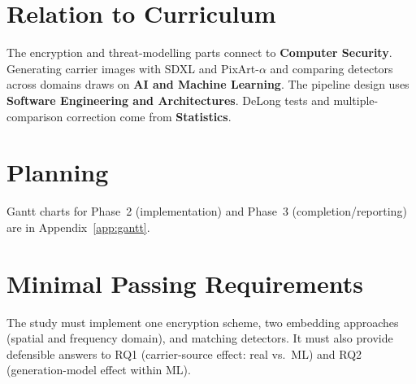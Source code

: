 \documentclass[10pt,twocolumn,a4paper]{article}
\begin{document}
\section{Relation to Curriculum}

The encryption and threat-modelling parts connect to \textbf{Computer Security}. Generating carrier images with SDXL and PixArt-$\alpha$ and comparing detectors across domains draws on \textbf{AI and Machine Learning}. The pipeline design uses \textbf{Software Engineering and Architectures}. DeLong tests and multiple-comparison correction come from \textbf{Statistics}.

\section{Planning}

Gantt charts for Phase~2 (implementation) and Phase~3 (completion/reporting) are in Appendix~\ref{app:gantt}.

\section{Minimal Passing Requirements}

The study must implement one encryption scheme, two embedding approaches (spatial and frequency domain), and matching detectors. It must also provide defensible answers to RQ1 (carrier-source effect: real vs.\ ML) and RQ2 (generation-model effect within ML).

\clearpage
\renewcommand{\refname}{References}
\end{document}
